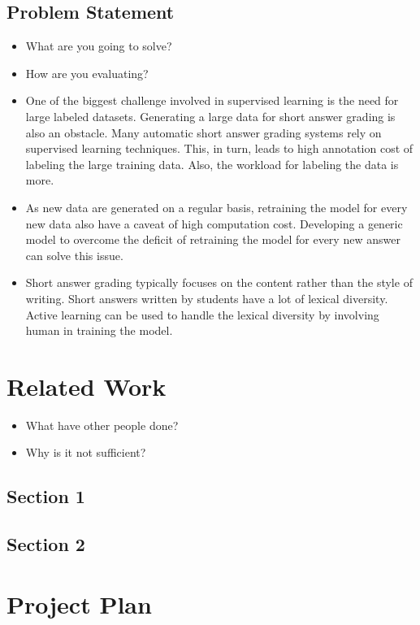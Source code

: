 \documentclass[rnd]{mas_proposal}
\begin{document}
\section{Problem Statement}
\begin{itemize}
    \item What are you going to solve?
    \item How are you evaluating?
    
\vspace*{1\baselineskip}
    \item One of the biggest challenge involved in supervised learning is the need for large labeled datasets. Generating a large data for short answer grading is also an obstacle. Many automatic short answer grading systems rely on supervised learning techniques. This, in turn, leads to high annotation cost of labeling the large training data. Also, the workload for labeling the data is more.
    \item As new data are generated on a regular basis, retraining the model for every new data also have a caveat of high computation cost.  Developing a generic model to overcome the deficit of retraining the model for every new answer can solve this issue.
    \item Short answer grading typically focuses on the content rather than the style of writing. Short answers written by students have a lot of lexical diversity. Active learning can be used to handle the lexical diversity by involving human in training the model.
\end{itemize}


\chapter{Related Work}
\begin{itemize}
    \item What have other people done?
    \item Why is it not sufficient?
\end{itemize}

\section{Section 1}
\section{Section 2}



\chapter{Project Plan}
\end{document}
